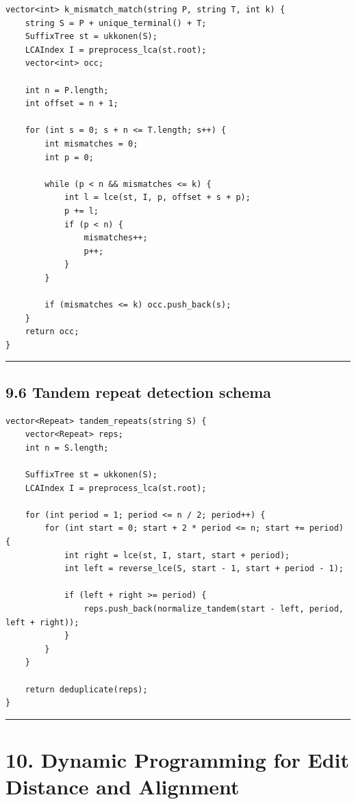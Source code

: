 \documentclass[11pt]{article}
\begin{document}
\begin{verbatim}
vector<int> k_mismatch_match(string P, string T, int k) {
    string S = P + unique_terminal() + T;
    SuffixTree st = ukkonen(S);
    LCAIndex I = preprocess_lca(st.root);
    vector<int> occ;

    int n = P.length;
    int offset = n + 1;

    for (int s = 0; s + n <= T.length; s++) {
        int mismatches = 0;
        int p = 0;

        while (p < n && mismatches <= k) {
            int l = lce(st, I, p, offset + s + p);
            p += l;
            if (p < n) {
                mismatches++;
                p++;
            }
        }

        if (mismatches <= k) occ.push_back(s);
    }
    return occ;
}
\end{verbatim}

\begin{center}\rule{0.5\linewidth}{0.5pt}\end{center}

\subsection{9.6 Tandem repeat detection schema}\label{tandem-repeat-detection-schema}

\begin{verbatim}
vector<Repeat> tandem_repeats(string S) {
    vector<Repeat> reps;
    int n = S.length;

    SuffixTree st = ukkonen(S);
    LCAIndex I = preprocess_lca(st.root);

    for (int period = 1; period <= n / 2; period++) {
        for (int start = 0; start + 2 * period <= n; start += period) {
            int right = lce(st, I, start, start + period);
            int left = reverse_lce(S, start - 1, start + period - 1);

            if (left + right >= period) {
                reps.push_back(normalize_tandem(start - left, period, left + right));
            }
        }
    }

    return deduplicate(reps);
}
\end{verbatim}

\begin{center}\rule{0.5\linewidth}{0.5pt}\end{center}

\section{10. Dynamic Programming for Edit Distance and Alignment}\label{dynamic-programming-for-edit-distance-and-alignment}
\end{document}
